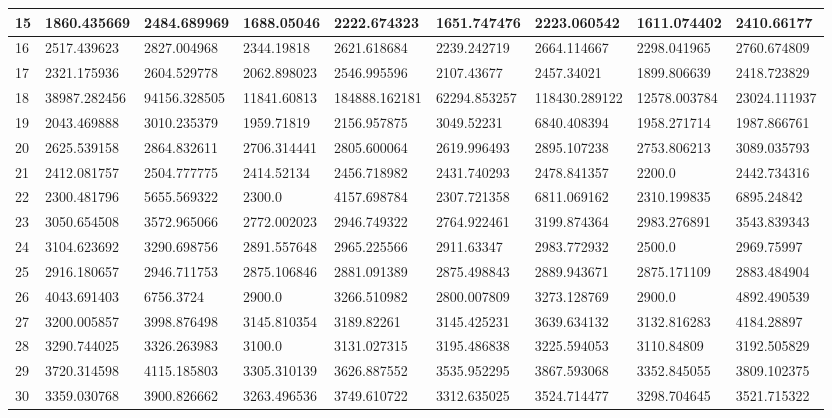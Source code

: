 \begin{table}[h!]
\begin{tabular}{|p{0.8cm}|p{1.6cm}|p{1.6cm}|p{1.6cm}|p{1.6cm}|p{1.6cm}|p{1.6cm}|p{1.6cm}|p{1.6cm}|}
 \hline
15  & 1860.435669 & 2484.689969 & 1688.05046 & 2222.674323 & 1651.747476 & 2223.060542 & 1611.074402 & 2410.66177 \\ 
 \hline
16  & 2517.439623 & 2827.004968 & 2344.19818 & 2621.618684 & 2239.242719 & 2664.114667 & 2298.041965 & 2760.674809 \\ 
 \hline
17  & 2321.175936 & 2604.529778 & 2062.898023 & 2546.995596 & 2107.43677 & 2457.34021 & 1899.806639 & 2418.723829 \\ 
 \hline
18  & 38987.282456 & 94156.328505 & 11841.60813 & 184888.162181 & 62294.853257 & 118430.289122 & 12578.003784 & 23024.111937 \\ 
 \hline
19  & 2043.469888 & 3010.235379 & 1959.71819 & 2156.957875 & 3049.52231 & 6840.408394 & 1958.271714 & 1987.866761 \\ 
 \hline
20  & 2625.539158 & 2864.832611 & 2706.314441 & 2805.600064 & 2619.996493 & 2895.107238 & 2753.806213 & 3089.035793 \\ 
 \hline
21  & 2412.081757 & 2504.777775 & 2414.52134 & 2456.718982 & 2431.740293 & 2478.841357 & 2200.0 & 2442.734316 \\ 
 \hline
22  & 2300.481796 & 5655.569322 & 2300.0 & 4157.698784 & 2307.721358 & 6811.069162 & 2310.199835 & 6895.24842 \\ 
 \hline
23  & 3050.654508 & 3572.965066 & 2772.002023 & 2946.749322 & 2764.922461 & 3199.874364 & 2983.276891 & 3543.839343 \\ 
 \hline
24  & 3104.623692 & 3290.698756 & 2891.557648 & 2965.225566 & 2911.63347 & 2983.772932 & 2500.0 & 2969.75997 \\ 
 \hline
25  & 2916.180657 & 2946.711753 & 2875.106846 & 2881.091389 & 2875.498843 & 2889.943671 & 2875.171109 & 2883.484904 \\ 
 \hline
26  & 4043.691403 & 6756.3724 & 2900.0 & 3266.510982 & 2800.007809 & 3273.128769 & 2900.0 & 4892.490539 \\ 
 \hline
27  & 3200.005857 & 3998.876498 & 3145.810354 & 3189.82261 & 3145.425231 & 3639.634132 & 3132.816283 & 4184.28897 \\ 
 \hline
28  & 3290.744025 & 3326.263983 & 3100.0 & 3131.027315 & 3195.486838 & 3225.594053 & 3110.84809 & 3192.505829 \\ 
 \hline
29  & 3720.314598 & 4115.185803 & 3305.310139 & 3626.887552 & 3535.952295 & 3867.593068 & 3352.845055 & 3809.102375 \\ 
 \hline
30  & 3359.030768 & 3900.826662 & 3263.496536 & 3749.610722 & 3312.635025 & 3524.714477 & 3298.704645 & 3521.715322 \\ 
 \hline


 \end{tabular}
\end{table}


